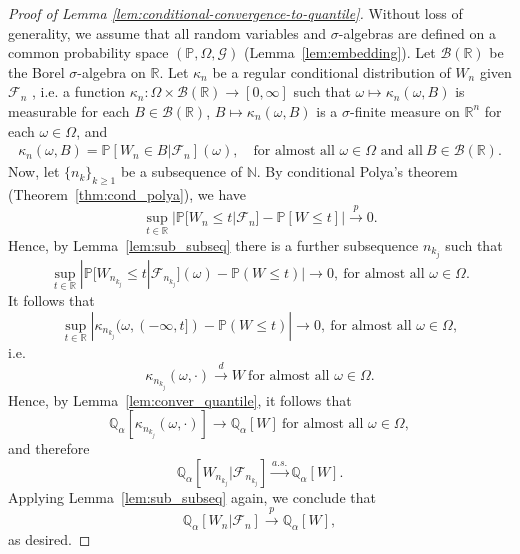 \documentclass[aos]{imsart}
\theoremstyle{plain}
\theoremstyle{remark}
\renewcommand{\P}{\mathbb{P}}							%
\newcommand{\Q}{\mathbb{Q}}								%
\newcommand{\R}{\mathbb{R}}								%
\newcommand{\convp}{\overset p \rightarrow}             %
\newcommand{\convd}{\overset d \rightarrow}             %
\newcommand{\convas}{\overset {a.s.} \rightarrow}       %
\begin{document}
	\begin{proof}[Proof of Lemma \ref{lem:conditional-convergence-to-quantile}]
		
		Without loss of generality, we assume that all random variables and $\sigma$-algebras are defined on a common probability space $(\P, \Omega, \mathcal G)$ (Lemma~\ref{lem:embedding}). Let $\mathcal B(\R)$ be the Borel $\sigma$-algebra on $\R$. Let $\kappa_{n}$ be a regular conditional distribution of $W_n$ given $\mathcal{F}_{n}$ \citep[Theorem 8.29]{Lista2017}, i.e. a function $\kappa_{n}: \Omega \times \mathcal B(\R) \rightarrow [0,\infty]$ such that $\omega \mapsto \kappa_{n}(\omega, B)$ is measurable for each $B \in \mathcal B(\R)$, $B \mapsto \kappa_{n}(\omega, B)$ is a $\sigma$-finite measure on $\R^n$ for each $\omega \in \Omega$, and 
		\begin{align*}
			\kappa_{n}(\omega, B) = \P[W_{n} \in B|\mathcal{F}_{n}](\omega), \quad \text{for almost all } \omega \in \Omega \text{ and all} \ B \in \mathcal B(\R).
		\end{align*}
		Now, let $\{n_k\}_{k \geq 1}$ be a subsequence of $\mathbb N$. By conditional Polya's theorem (Theorem~\ref{thm:cond_polya}), we have 
		\begin{equation}
			\sup_{t \in \R}|\P[W_{n}\leq t|\mathcal{F}_n]-\P[W\leq t]| \convp0.
		\end{equation}
		Hence, by Lemma~\ref{lem:sub_subseq} there is a further subsequence $n_{k_j}$ such that
		\begin{equation}
			\sup_{t \in \R}|\P[W_{n_{k_j}}\leq t|\mathcal{F}_{n_{k_j}}](\omega)-\P(W\leq t)|\rightarrow0,\ \text{for almost all } \omega \in \Omega.
		\end{equation}	
		It follows that 
		\begin{equation}
			\sup_{t \in \R}|\kappa_{n_{k_j}}(\omega, (-\infty, t])-\P(W\leq t)|\rightarrow0,\ \text{for almost all } \omega \in \Omega,
		\end{equation}
		i.e.
		\begin{equation}
			\kappa_{n_{k_j}}(\omega, \cdot) \convd W \ \text{for almost all } \omega \in \Omega.
		\end{equation}
		Hence, by Lemma~\ref{lem:conver_quantile}, it follows that
		\begin{equation}
			\Q_{\alpha}[\kappa_{n_{k_j}}(\omega, \cdot)] \rightarrow \Q_{\alpha}[W] \ \text{for almost all } \omega \in \Omega,
		\end{equation}
		and therefore
		\begin{equation}
			\Q_{\alpha}[W_{n_{k_j}}|\mathcal{F}_{n_{k_j}}] \convas \Q_{\alpha}[W].
		\end{equation}
		Applying Lemma~\ref{lem:sub_subseq} again, we conclude that
		\begin{equation}
			\Q_{\alpha}[W_{n}|\mathcal{F}_{n}] \convp \Q_{\alpha}[W],
		\end{equation}
		as desired.
	\end{proof}
\end{document}
